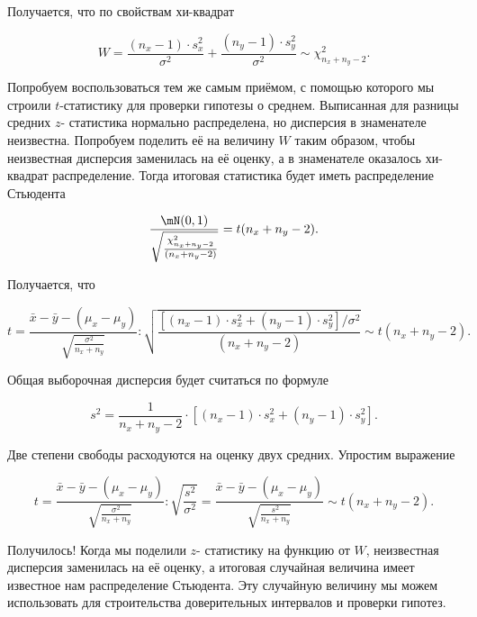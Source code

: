\documentclass[12pt, a4paper, oneside]{article}
\begin{document}
Получается, что по свойствам хи-квадрат

$$
W = \frac{(n_x - 1) \cdot s_x^2}{\sigma^2}  + \frac{(n_y - 1) \cdot s_y^2}{\sigma^2} \sim \chi^2_{n_x + n_y - 2}. 
$$

Попробуем воспользоваться тем же самым приёмом, с помощью которого мы строили $t$-статистику для проверки гипотезы о среднем. Выписанная для разницы средних $z$- статистика нормально распределена, но дисперсия в знаменателе неизвестна. Попробуем поделить её на величину $W$ таким образом, чтобы неизвестная дисперсия заменилась на её оценку, а в знаменателе оказалось хи-квадрат распределение. Тогда итоговая статистика будет иметь распределение Стьюдента

\begin{equation*} 
\frac{\mN(0,1)}{ \sqrt{\frac{\chi^2_{n_x + n_y - 2}}{ (n_x + n_y - 2)}}} = t(n_x + n_y - 2).
\end{equation*} 

Получается, что

\begin{equation*} 
t = \frac{\bar{x} - \bar{y} - (\mu_x - \mu_y)}{\sqrt{\frac{\sigma^2}{n_x + n_y}}} : \sqrt{ \frac{ [(n_x - 1) \cdot s_x^2 + (n_y - 1) \cdot s_y^2] / \sigma^2} {(n_x + n_y - 2)}} \sim t(n_x + n_y - 2).
\end{equation*} 

Общая выборочная дисперсия будет считаться по формуле 

$$
s^2 = \frac{1}{n_x + n_y - 2} \cdot \left[ (n_x - 1) \cdot s_x^2 + (n_y - 1) \cdot s_y^2 \right]. 
$$

Две степени свободы расходуются на оценку двух средних. Упростим выражение 

\begin{equation*} 
t = \frac{\bar{x} - \bar{y} - (\mu_x - \mu_y)}{\sqrt{\frac{\sigma^2}{n_x + n_y}}} : \sqrt{ \frac{s^2} {\sigma^2}} =  \frac{\bar{x} - \bar{y} - (\mu_x - \mu_y)}{\sqrt{\frac{s^2}{n_x + n_y}}} \sim t(n_x + n_y - 2).
\end{equation*} 

Получилось! Когда мы поделили $z$- статистику на функцию от $W$, неизвестная дисперсия заменилась на её оценку, а итоговая случайная величина имеет известное нам распределение Стьюдента. Эту случайную величину мы можем использовать для строительства доверительных интервалов и проверки гипотез. 



\end{document}
